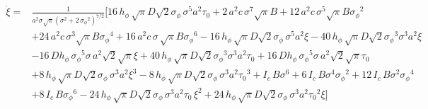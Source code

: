 \begin{align}\dot{\xi}=&\frac{1}{{a}^{2}{\sigma}{\sqrt{\pi}}\left({\sigma}^{2}+2\,{{\sigma_{\phi}}}^{2}\right)^{7/2}}\Bigg[16\,{h_{\phi}}\,\sqrt{\pi}D\sqrt{2}{\sigma_{\phi}}\,{\sigma}^{5}{a}^{2}{\tau_0}+2\,{a}^{2}c\,{\sigma}^{7}\sqrt{\pi}B+12\,{a}^{2}c\,{\sigma}^{5}\sqrt{\pi}B{{\sigma_{\phi}}}^{2}\nonumber\\&+24\,{a}^{2}c\,{\sigma}^{3}\sqrt{\pi}B{{\sigma_{\phi}}}^{4}+16\,{a}^{2}c\,\sigma\,\sqrt{\pi}B{{\sigma_{\phi}}}^{6}-16\,{h_{\phi}}\,\sqrt{\pi}D\sqrt{2}{\sigma_{\phi}}\,{\sigma}^{5}{a}^{2}{\xi}-40\,{h_{\phi}}\,\sqrt{\pi}D\sqrt{2}{{\sigma_{\phi}}}^{3}{\sigma}^{3}{a}^{2}{\xi}\nonumber\\&-16\,D{h_{\phi}}\,{{\sigma_{\phi}}}^{5}\sigma\,{a}^{2}\sqrt{2}\sqrt{\pi}{\xi}+40\,{h_{\phi}}\,\sqrt{\pi}D\sqrt{2}{{\sigma_{\phi}}}^{3}{\sigma}^{3}{a}^{2}{\tau_0}+16\,D{h_{\phi}}\,{{\sigma_{\phi}}}^{5}\sigma\,{a}^{2}\sqrt{2}\sqrt{\pi}{\tau_0}\nonumber\\&+8\,{h_{\phi}}\,\sqrt{\pi}D\sqrt{2}{\sigma_{\phi}}\,{\sigma}^{3}{a}^{2}{{\xi}}^{3}-8\,{h_{\phi}}\,\sqrt{\pi}D\sqrt{2}{\sigma_{\phi}}\,{\sigma}^{3}{a}^{2}{{\tau_0}}^{3}+{I_{c}}\,B{\sigma}^{6}+6\,{I_{c}}\,B{\sigma}^{4}{{\sigma_{\phi}}}^{2}+12\,{I_{c}}\,B{\sigma}^{2}{{\sigma_{\phi}}}^{4}\nonumber\\&+8\,{I_{c}}\,B{{\sigma_{\phi}}}^{6}-24\,{h_{\phi}}\,\sqrt{\pi}D\sqrt{2}{\sigma_{\phi}}\,{\sigma}^{3}{a}^{2}{\tau_0}\,{{\xi}}^{2}+24\,{h_{\phi}}\,\sqrt{\pi}D\sqrt{2}{\sigma_{\phi}}\,{\sigma}^{3}{a}^{2}{{\tau_0}}^{2}{\xi}\Bigg]
\end{align}
